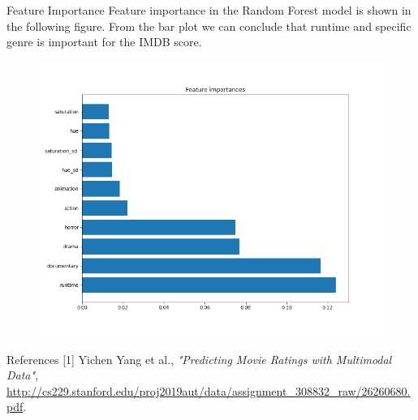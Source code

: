 \documentclass[final]{beamer}
\newlength{\onecolwid}
\begin{document}
\begin{frame}[t]
\begin{columns}[t]
\begin{column}{\onecolwid}
\begin{block}{Feature Importance}
Feature importance in the Random Forest model is shown in the following figure. From the bar plot we can conclude that runtime and specific genre is important for the IMDB score.

\begin{figure}
	\centering
	\includegraphics[width=1.2\linewidth, height=0.35\textheight, keepaspectratio]{../plots/feature_importancvce.png}
	\label{fig:feature_imp}
\end{figure}
\end{block}

\begin{block}{References}
\small
[1] Yichen Yang et al., {\it "Predicting Movie Ratings with Multimodal Data"},
\url{http://cs229.stanford.edu/proj2019aut/data/assignment_308832_raw/26260680.pdf}.
\end{block}

\end{column} %

\end{columns} %

\end{frame} %
\end{document}

